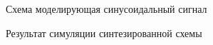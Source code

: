 \documentclass[a4paper,14pt]{extarticle}
\begin{document}
\begin{figure}[H]
\begin{minipage}[h]{0.49\linewidth}
\end{minipage}
\hfill
\begin{minipage}[h]{0.49\linewidth}
\end{minipage}
\caption{Схема моделирующая синусоидальный сигнал}
\label{000}
\end{figure}

\begin{figure}[H]
\caption{Результат симуляции синтезированной схемы}
\label{002}
\end{figure}
\end{document}

